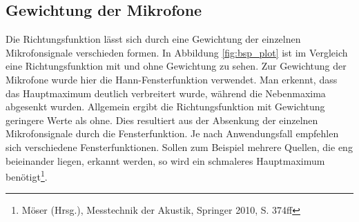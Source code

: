 \subsection{Gewichtung der Mikrofone}

	Die Richtungsfunktion lässt sich durch eine Gewichtung der einzelnen Mikrofonsignale verschieden formen. In Abbildung \ref{fig:bsp_plot} ist im Vergleich eine Richtungsfunktion mit und ohne Gewichtung zu sehen.
	Zur Gewichtung der Mikrofone wurde hier die Hann-Fensterfunktion verwendet. Man erkennt, dass das Hauptmaximum deutlich verbreitert wurde, während die Nebenmaxima abgesenkt wurden.
	Allgemein ergibt die Richtungsfunktion mit Gewichtung geringere Werte als ohne.
	Dies resultiert aus der Absenkung der einzelnen Mikrofonsignale durch die Fensterfunktion.
	Je nach Anwendungsfall empfehlen sich verschiedene Fensterfunktionen. Sollen zum Beispiel mehrere Quellen, die eng beieinander liegen, erkannt werden, so wird ein schmaleres Hauptmaximum benötigt\footnote{Möser (Hrsg.), Messtechnik der Akustik, Springer 2010, S. 374ff}.